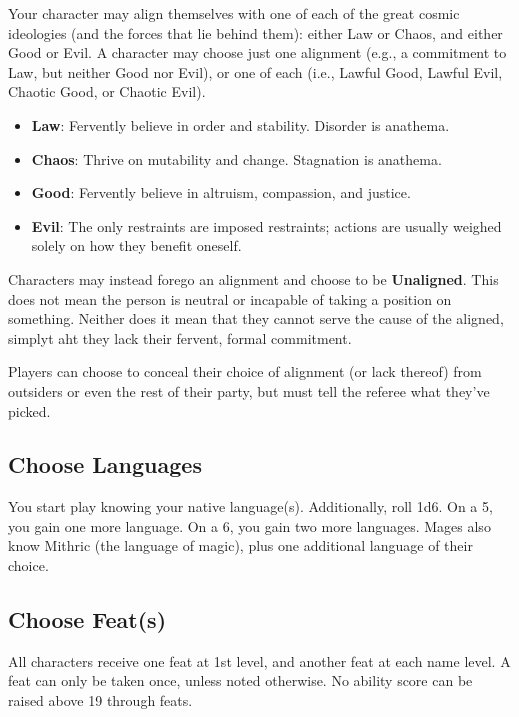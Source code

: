 \documentclass{article}
\begin{document}
\begin{multicols}{2}
Your character may align themselves with one of each of the great cosmic
ideologies (and the forces that lie behind them): either Law or Chaos,
and either Good or Evil. A character may choose just one alignment
(e.g., a commitment to Law, but neither Good nor Evil), or one of each
(i.e., Lawful Good, Lawful Evil, Chaotic Good, or Chaotic Evil).

\begin{itemize}
\tightlist
\item
  \textbf{Law}: Fervently believe in order and stability. Disorder is
  anathema.
\item
  \textbf{Chaos}: Thrive on mutability and change. Stagnation is
  anathema.
\item
  \textbf{Good}: Fervently believe in altruism, compassion, and justice.
\item
  \textbf{Evil}: The only restraints are imposed restraints; actions are
  usually weighed solely on how they benefit oneself.
\end{itemize}

Characters may instead forego an alignment and choose to be
\textbf{Unaligned}. This does not mean the person is neutral or
incapable of taking a position on something. Neither does it mean that
they cannot serve the cause of the aligned, simplyt aht they lack their
fervent, formal commitment.

Players can choose to conceal their choice of alignment (or lack
thereof) from outsiders or even the rest of their party, but must tell
the referee what they've picked.

\subsection{Choose Languages}\label{choose-languages}

You start play knowing your native language(s). Additionally, roll 1d6.
On a 5, you gain one more language. On a 6, you gain two more languages.
Mages also know Mithric (the language of magic), plus one additional
language of their choice.

\subsection{Choose Feat(s)}\label{choose-feats}

All characters receive one feat at 1st level, and another feat at each
name level. A feat can only be taken once, unless noted otherwise. No
ability score can be raised above 19 through feats.


\end{multicols}
\end{document}

